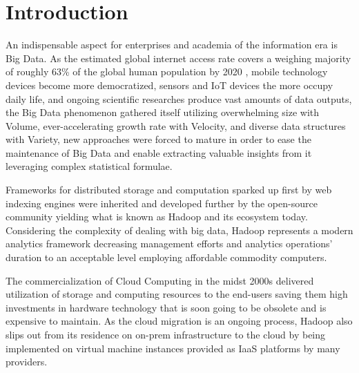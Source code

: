 \documentclass[review]{elsarticle}
\begin{document}
\linenumbers

\section{Introduction}

An indispensable aspect for enterprises and academia of the information era is Big Data. As the estimated global internet access rate covers a weighing majority of roughly 63\% of the global human population by 2020 \cite{noauthor_world_nodate}, mobile technology devices become more democratized, sensors and IoT devices the more occupy daily life, and ongoing scientific researches produce vast amounts of data outputs, the Big Data phenomenon gathered itself utilizing overwhelming size with Volume, ever-accelerating growth rate with Velocity, and diverse data structures with Variety, new approaches were forced to mature in order to ease the maintenance of Big Data and enable extracting valuable insights from it leveraging complex statistical formulae.

Frameworks for distributed storage and computation sparked up first by web indexing engines were inherited and developed further by the open-source community yielding what is known as Hadoop \cite{noauthor_apache_nodate} and its ecosystem today. Considering the complexity of dealing with big data, Hadoop represents a modern analytics framework decreasing management efforts and analytics operations' duration to an acceptable level employing affordable commodity computers. 

The commercialization of Cloud Computing in the midst 2000s \cite{aws_announcing_ec2} delivered utilization of storage and computing resources to the end-users saving them high investments in hardware technology that is soon going to be obsolete and is expensive to maintain. As the cloud migration is an ongoing process, Hadoop also slips out from its residence on on-prem infrastructure to the cloud by being implemented on virtual machine instances provided as IaaS platforms by many providers. 
\end{document}
